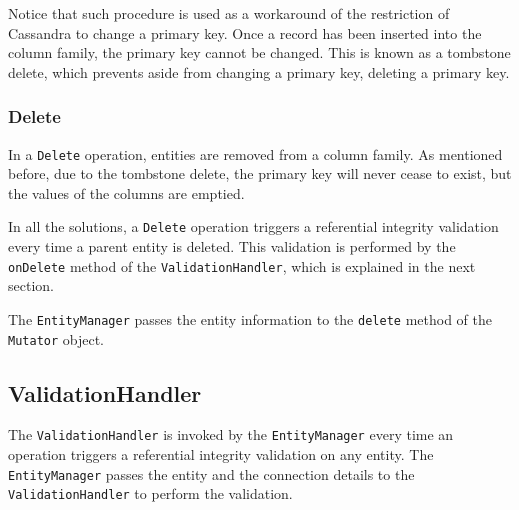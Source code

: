 		
		Notice that such procedure is used as a workaround of the restriction of
		Cassandra to change a primary key. Once a record has been
		inserted into the column family, the primary key cannot  be changed. This is
		known as a tombstone delete, which prevents aside from changing a primary
		key, deleting a primary key.
		
		\subsubsection{Delete}\label{ss:delete}
		In a  \texttt{Delete} operation, entities are removed from a column
		family. As mentioned before, due to the tombstone delete, the primary key
		will never cease to exist, but the values of the columns are emptied. 
		
		In all the solutions,  a \texttt{Delete} operation triggers a referential
		integrity validation every time a parent entity is deleted.  This validation
		is performed by the \texttt{onDelete} method of the
		\texttt{ValidationHandler}, which is explained in the next section. 
		 
		 The 	\texttt{EntityManager} passes the entity information to the
		\texttt{delete} method of the \texttt{Mutator} object.
 		
		
		\subsection{ValidationHandler}\label{ss:VH}
		The \texttt{ValidationHandler} is invoked by the \texttt{EntityManager} every time
		an operation triggers a
		referential integrity validation on any entity. 
		The \texttt{EntityManager} passes the entity and the connection details  to
		the \texttt{ValidationHandler} to perform the validation.
		
